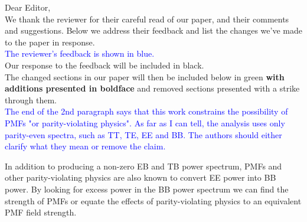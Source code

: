 \documentclass{article}
\newcommand{\added}[1]{\textbf{#1}}
\newcommand{\reviewer}[1]{\textcolor{Blue}{#1}}
\newcommand{\diff}[1]{\textcolor{PineGreen}{#1}}
\begin{document}
Dear Editor,\\

We thank the reviewer for their  careful read of our paper, and their comments and suggestions. Below we address their feedback and list the changes we've made to the paper in response.\\


\reviewer{The reviewer's feedback is shown in blue.}\\

Our response to the feedback will be included in black.\\

\diff{The changed sections in our paper will then be included below in green \added{with additions presented in boldface} and removed sections presented with a strike through them.}\\


\reviewer{The end of the 2nd paragraph says that this work constrains the possibility of PMFs "or parity-violating physics". As far as I can tell, the analysis uses only parity-even spectra, such as TT, TE, EE and BB. The authors should either clarify what they mean or remove the claim.}

In addition to producing a non-zero EB and TB power spectrum, PMFs and other parity-violating physics are also known to convert EE power into BB power. By looking for excess power in the BB power spectrum we can find the strength of PMFs or equate the effects of parity-violating physics to an equivalent PMF field strength.
\end{document}
